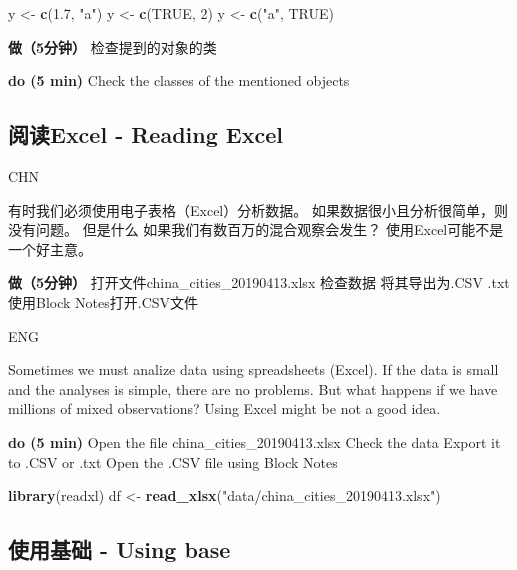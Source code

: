 \documentclass[]{book}
\newenvironment{Shaded}{\begin{snugshade}}{\end{snugshade}}
\newcommand{\DecValTok}[1]{\textcolor[rgb]{0.00,0.00,0.81}{#1}}
\newcommand{\FloatTok}[1]{\textcolor[rgb]{0.00,0.00,0.81}{#1}}
\newcommand{\KeywordTok}[1]{\textcolor[rgb]{0.13,0.29,0.53}{\textbf{#1}}}
\newcommand{\NormalTok}[1]{#1}
\newcommand{\OtherTok}[1]{\textcolor[rgb]{0.56,0.35,0.01}{#1}}
\newcommand{\StringTok}[1]{\textcolor[rgb]{0.31,0.60,0.02}{#1}}
\begin{document}
\begin{Shaded}
\begin{Highlighting}[]
\NormalTok{y <-}\StringTok{ }\KeywordTok{c}\NormalTok{(}\FloatTok{1.7}\NormalTok{, }\StringTok{"a"}\NormalTok{)}
\NormalTok{y <-}\StringTok{ }\KeywordTok{c}\NormalTok{(}\OtherTok{TRUE}\NormalTok{, }\DecValTok{2}\NormalTok{)}
\NormalTok{y <-}\StringTok{ }\KeywordTok{c}\NormalTok{(}\StringTok{"a"}\NormalTok{, }\OtherTok{TRUE}\NormalTok{)}
\end{Highlighting}
\end{Shaded}

\textbf{做（5分钟）}
检查提到的对象的类

\textbf{do (5 min)}
Check the classes of the mentioned objects

\hypertarget{excel---reading-excel}{%
\subsection{阅读Excel - Reading Excel}\label{excel---reading-excel}}

CHN

有时我们必须使用电子表格（Excel）分析数据。 如果数据很小且分析很简单，则没有问题。 但是什么
如果我们有数百万的混合观察会发生？ 使用Excel可能不是一个好主意。

\textbf{做（5分钟）}
打开文件china\_cities\_20190413.xlsx
检查数据
将其导出为.CSV .txt
使用Block Notes打开.CSV文件

ENG

Sometimes we must analize data using spreadsheets (Excel). If the data is small and the analyses is simple, there are no problems. But what
happens if we have millions of mixed observations? Using Excel might be not a good idea.

\textbf{do (5 min)}
Open the file china\_cities\_20190413.xlsx
Check the data
Export it to .CSV or .txt
Open the .CSV file using Block Notes

\begin{Shaded}
\begin{Highlighting}[]
\KeywordTok{library}\NormalTok{(readxl)}
\NormalTok{df <-}\StringTok{ }\KeywordTok{read_xlsx}\NormalTok{(}\StringTok{"data/china_cities_20190413.xlsx"}\NormalTok{)}
\end{Highlighting}
\end{Shaded}

\hypertarget{using-base}{%
\subsection{使用基础 - Using base}\label{using-base}}
\end{document}
